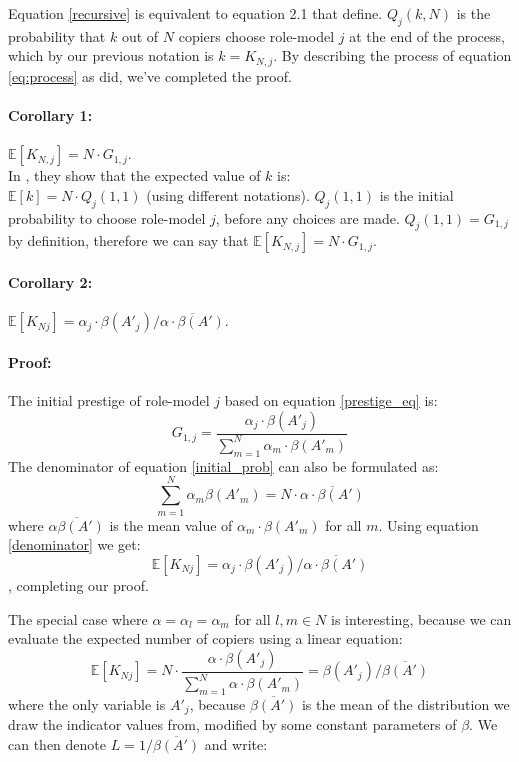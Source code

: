 \documentclass[11pt]{article}
\begin{document}
Equation \ref{recursive} is equivalent to equation 2.1 that \citet{GBD} define.
$Q_j(k,N)$ is the probability that $k$ out of $N$ copiers choose role-model $j$ at the end of the process, which by our previous notation is $k=K_{N,j}$.
By describing the process of equation \ref{eq:process} as \citep{GBD} did, we've completed the proof.

\paragraph{Corollary 1: } $\mathbb{E}[K_{N,j}] = N \cdot G_{1,j}$.\\
In \citep[equation 2.3]{GBD}, they show that the expected value of $k$ is: \\
$\mathbb{E}[k] = N \cdot Q_j(1,1)$ (using different notations).
$Q_j(1,1)$ is the initial probability to choose role-model $j$, before any choices are made.
$Q_j(1,1) = G_{1,j}$ by definition, therefore we can say that $\mathbb{E}[K_{N,j}]=N \cdot G_{1,j}$.\\

\paragraph{Corollary 2: } $\mathbb{E}[K_{Nj}] = \alpha_j \cdot \beta(A'_j) / \overline{\alpha \cdot \beta(A')}$.
\paragraph{Proof: } The initial prestige of role-model $j$ based on equation \ref{prestige_eq} is:
\begin{equation}\label{initial_prob}
G_{1,j} = \frac{\alpha_j\cdot\beta(A'_j)}{\sum\limits_{m=1}^{N}\alpha_m\cdot\beta(A'_m)}
\end{equation}
The denominator of equation \ref{initial_prob} can also be formulated as:
\begin{equation}\label{denominator}
 \sum\limits_{m=1}^{N}\alpha_m\beta(A'_m) = N \cdot \overline{\alpha \cdot \beta(A')}
\end{equation}
where $\overline{\alpha\beta(A')}$ is the mean value of $\alpha_m\cdot\beta(A'_m)$ for all $m$.
Using equation \ref{denominator} we get:
\begin{equation}
\mathbb{E}[K_{Nj}] = \alpha_j \cdot \beta(A'_j) \bigg/ \overline{\alpha \cdot \beta(A')}
\end{equation},
completing our proof.

The special case where $\alpha = \alpha_l=\alpha_m$ for all $l,m \in N$ is interesting, because we can evaluate the expected number of copiers using a linear equation:
\begin{equation}
\mathbb{E}[K_{Nj}]= N\cdot\frac{\alpha\cdot\beta(A'_j)}{\sum\limits_{m=1}^{N}\alpha\cdot\beta(A'_m)} =\beta(A'_j) \bigg/ \overline{\beta(A')}
\end{equation}
where the only variable is $A'_j$, because $\overline{\beta(A')}$ is the mean of the distribution we draw the indicator values from, modified by some constant parameters of $\beta$.
We can then denote $L = 1/\overline{\beta(A')}$ and write:
\end{document}
